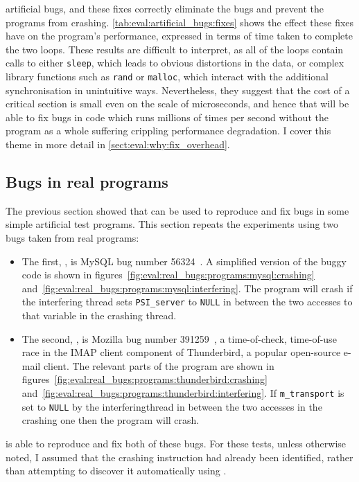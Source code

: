 artificial bugs, and these fixes correctly eliminate the bugs and
prevent the programs from crashing.
\autoref{tab:eval:artificial_bugs:fixes} shows the effect these fixes
have on the program's performance, expressed in terms of time taken to
complete the two loops.  These results are difficult to interpret, as
all of the loops contain calls to either \texttt{sleep}, which leads
to obvious distortions in the data, or complex library functions such
as \texttt{rand} or \texttt{malloc}, which interact with the
additional synchronisation in unintuitive ways.  Nevertheless, they
suggest that the cost of a {\technique} critical section is small even
on the scale of microseconds, and hence that {\technique} will be able
to fix bugs in code which runs millions of times per second without
the program as a whole suffering crippling performance degradation.  I
cover this theme in more detail in
\autoref{sect:eval:why:fix_overhead}.

\subsection{Bugs in real programs}
\label{sect:eval:does:real}

The previous section showed that {\implementation} can be used to reproduce
and fix bugs in some simple artificial test programs.  This section
repeats the experiments using two bugs taken from real programs:
\begin{itemize}
\item The first, , is MySQL bug number
  56324~\cite{FFFCorreia2010}.  A simplified version of the buggy code
  is shown in figures~\ref{fig:eval:real_bugs:programs:mysql:crashing}
  and~\ref{fig:eval:real_bugs:programs:mysql:interfering}.  The
  program will crash if the interfering thread sets
  \texttt{PSI\_server} to \texttt{NULL} in between the two accesses to
  that variable in the crashing thread.
\item The second, , is Mozilla bug number
  391259~\cite{FFFMery2007}, a time-of-check, time-of-use race in the
  IMAP client component of Thunderbird, a popular open-source e-mail
  client.  The relevant parts of the program are shown in
  figures~\ref{fig:eval:real_bugs:programs:thunderbird:crashing}
  and~\ref{fig:eval:real_bugs:programs:thunderbird:interfering}.  If
  \verb|m_transport| is set to \verb|NULL| by the
  \gls{interferingthread} in between the two accesses in the crashing
  one then the program will crash.
\end{itemize}
{\implementation} is able to reproduce and fix both of these bugs.  For
these tests, unless otherwise noted, I assumed that the crashing
instruction had already been identified, rather than attempting to
discover it automatically using {\technique}.

